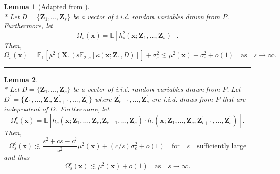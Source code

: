 \documentclass[letterpaper,10pt]{article}
\numberwithin{equation}{section}
\numberwithin{thm}{section}
\newtheorem{lem}{Lemma}
\numberwithin{lem}{section}
\numberwithin{cor}{section}
\newcommand{\E}{\mathbb{E}}
\newcommand{\1}{\mathbbm{1}}
\begin{document}
\begin{lem}[Adapted from \citet{demirkaya_optimal_2024}]\label{lem:omega_s}\mbox{}\\*
	Let $D = \{\mathbf{Z}_1, \dotsc, \mathbf{Z}_{s}\}$ be a vector of i.i.d. random variables drawn from $P$.
	Furthermore, let
	\begin{equation}
		\Omega_{s}\left(\mathbf{x}\right)
		= \E\left[h_{s}^{2}\left(\mathbf{x}; \mathbf{Z}_1, \ldots,  \mathbf{Z}_{s}\right)\right].
	\end{equation}
	Then,
	\begin{equation}
		\Omega_{s}\left(\mathbf{x}\right)
		= \E_1\left[\mu^2\left(\mathbf{X}_1\right) s \E_{2:s}\left[\kappa\left(\mathbf{x}; \mathbf{Z}_1, D\right)\right]\right] + \sigma_{\varepsilon}^2
		\lesssim \mu^2(\mathbf{x}) + \sigma_{\varepsilon}^2 + o(1)
		\quad \text{as} \quad s \rightarrow \infty.
	\end{equation}
\end{lem}

\hrule

\begin{lem}\label{lem:omega_sc}\mbox{}\\*
	Let $D = \{\mathbf{Z}_1, \dotsc, \mathbf{Z}_{s}\}$ be a vector of i.i.d. random variables drawn from $P$.
	Let $D^{\prime} = \{\mathbf{Z}_1, \dotsc, \mathbf{Z}_{c}, \mathbf{Z}_{c+1}^{\prime}, \dotsc,  \mathbf{Z}_{s}^{\prime}\}$ where $\mathbf{Z}_{c+1}^{\prime}, \dotsc,  \mathbf{Z}_{s}^{\prime}$ are i.i.d. draws from $P$ that are independent of $D$.
	Furthermore, let
	\begin{equation}
		\Omega_{s}^{c}\left(\mathbf{x}\right)
		= \E\left[h_{s}\left(\mathbf{x}; \mathbf{Z}_1, \ldots, \mathbf{Z}_{c}, \mathbf{Z}_{c+1}, \ldots, \mathbf{Z}_{s}\right) \cdot
			h_{s}\left(\mathbf{x}; \mathbf{Z}_1, \ldots,\mathbf{Z}_{c}, \mathbf{Z}_{c+1}^{\prime}, \ldots, \mathbf{Z}_{s}^{\prime}\right)\right].
	\end{equation}
	Then,
	\begin{equation}
		\Omega_{s}^{c}\left(\mathbf{x}\right)
		\lesssim \frac{s^2 + cs  - c^2}{s^2} \mu^2(\mathbf{x}) + (c/s) \sigma_{\varepsilon}^2 + o(1)
		\quad \text{for} \quad s \quad \text{sufficiently large}
	\end{equation}
	and thus
	\begin{equation}
		\Omega_{s}^{c}\left(\mathbf{x}\right)
		\lesssim \mu^2(\mathbf{x}) + o(1)
		\quad \text{as} \quad s \rightarrow \infty.
	\end{equation}
\end{lem}
\end{document}
